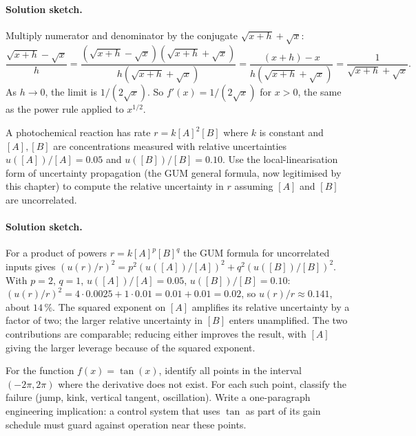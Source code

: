 \paragraph{Solution sketch.}
Multiply numerator and denominator by the conjugate $\sqrt{x + h}
+ \sqrt{x}$:
\[
\frac{\sqrt{x + h} - \sqrt{x}}{h} = \frac{(\sqrt{x + h} - \sqrt{x})
(\sqrt{x + h} + \sqrt{x})}{h (\sqrt{x + h} + \sqrt{x})} =
\frac{(x + h) - x}{h (\sqrt{x + h} + \sqrt{x})} =
\frac{1}{\sqrt{x + h} + \sqrt{x}}.
\]
As $h \to 0$, the limit is $1/(2 \sqrt{x})$. So $f'(x) = 1/(2
\sqrt{x})$ for $x > 0$, the same as the power rule applied to
$x^{1/2}$.

\begin{exercise}
A photochemical reaction has rate $r = k [A]^{2} [B]$ where $k$
is constant and $[A], [B]$ are concentrations measured with
relative uncertainties $u([A])/[A] = 0.05$ and $u([B])/[B] =
0.10$. Use the local-linearisation form of uncertainty
propagation (the GUM general formula, now legitimised by
this chapter) to compute the relative uncertainty in $r$ assuming
$[A]$ and $[B]$ are uncorrelated.
\end{exercise}

\paragraph{Solution sketch.}
For a product of powers $r = k [A]^{p} [B]^{q}$ the GUM formula
for uncorrelated inputs gives $(u(r)/r)^{2} = p^{2}
(u([A])/[A])^{2} + q^{2} (u([B])/[B])^{2}$. With $p = 2$,
$q = 1$, $u([A])/[A] = 0.05$, $u([B])/[B] = 0.10$:
$(u(r)/r)^{2} = 4 \cdot 0.0025 + 1 \cdot 0.01 = 0.01 + 0.01 =
0.02$, so $u(r)/r \approx 0.141$, about $14\,\%$. The squared
exponent on $[A]$ amplifies its relative uncertainty by a factor
of two; the larger relative uncertainty in $[B]$ enters
unamplified. The two contributions are comparable; reducing
either improves the result, with $[A]$ giving the larger leverage
because of the squared exponent.

\begin{exercise}
For the function $f(x) = \tan(x)$, identify all points in the
interval $(-2\pi, 2\pi)$ where the derivative does not exist.
For each such point, classify the failure (jump, kink, vertical
tangent, oscillation). Write a one-paragraph engineering
implication: a control system that uses $\tan$ as part of its
gain schedule must guard against operation near these points.
\end{exercise}

